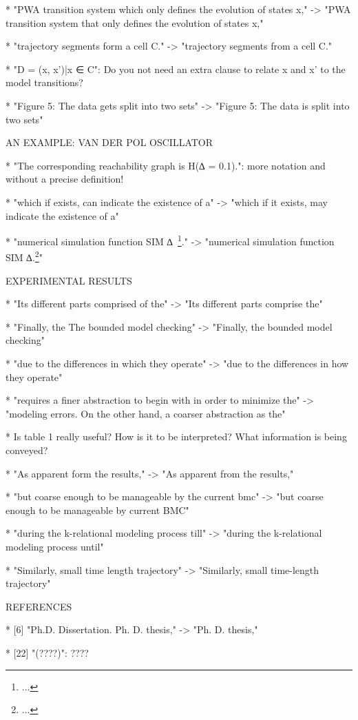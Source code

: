 * "PWA transition system which only defines the evolution of states x,"
-> "PWA transition system that only defines the evolution of states x,"

* "trajectory segments form a cell C."
-> "trajectory segments from a cell C."

* "D = {(x, x')|x ∈ C}": Do you not need an extra clause to relate x and x'
  to the model transitions?

* "Figure 5: The data gets split into two sets"
-> "Figure 5: The data is split into two sets"

AN EXAMPLE: VAN DER POL OSCILLATOR

* "The corresponding reachability graph is H(∆ = 0.1).": more notation and
  without a precise definition!

* "which if exists, can indicate the existence of a"
-> "which if it exists, may indicate the existence of a"

* "numerical simulation function SIM ∆~\footnote{...}."
-> "numerical simulation function SIM ∆.\footnote{...}"

EXPERIMENTAL RESULTS

* "Its different parts comprised of the"
-> "Its different parts comprise the"

* "Finally, the The bounded model checking"
-> "Finally, the bounded model checking"

* "due to the differences in which they operate"
-> "due to the differences in how they operate"

* "requires a finer abstraction to begin with in order to minimize the"
-> "modeling errors. On the other hand, a coarser abstraction as the"

* Is table 1 really useful? How is it to be interpreted? What information is
  being conveyed?

* "As apparent form the results,"
-> "As apparent from the results,"

* "but coarse enough to be manageable by the current bmc"
-> "but coarse enough to be manageable by current BMC"

* "during the k-relational modeling process till"
-> "during the k-relational modeling process until"

* "Similarly, small time length trajectory"
-> "Similarly, small time-length trajectory"

REFERENCES

* [6] "Ph.D. Dissertation. Ph. D. thesis," -> "Ph. D. thesis,"

* [22] "(????)": ????

